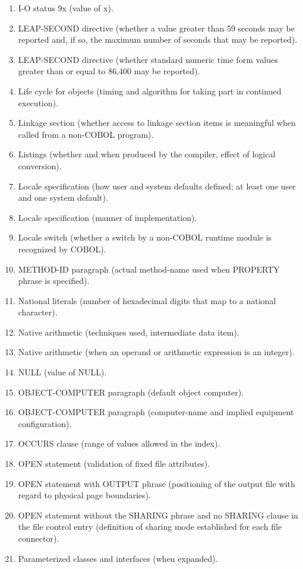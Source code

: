 \begin{enumerate}
\item I-O status 9x (value of x).
\item LEAP-SECOND directive (whether a value greater than 59 seconds may be reported and, if so, the maximum
  number of seconds that may be reported).
\item LEAP-SECOND directive (whether standard numeric time form values greater than or equal to 86,400 may be
  reported).
\item Life cycle for objects (timing and algorithm for taking part in continued execution).
\item Linkage section (whether access to linkage section items is meaningful when called from a non-COBOL
  program).
\item Listings (whether and when produced by the compiler, effect of logical conversion).
\item Locale specification (how user and system defaults defined; at least one user and one system default).
\item Locale specification (manner of implementation).
\item Locale switch (whether a switch by a non-COBOL runtime module is recognized by COBOL).
\item METHOD-ID paragraph (actual method-name used when PROPERTY phrase is specified).
\item National literals (number of hexadecimal digits that map to a national character).
\item Native arithmetic (techniques used, intermediate data item).
\item Native arithmetic (when an operand or arithmetic expression is an integer).
\item NULL (value of NULL).
\item OBJECT-COMPUTER paragraph (default object computer).
\item OBJECT-COMPUTER paragraph (computer-name and implied equipment configuration).
\item OCCURS clause (range of values allowed in the index).
\item OPEN statement (validation of fixed file attributes).
\item OPEN statement with OUTPUT phrase (positioning of the output file with regard to physical page boundaries).
\item OPEN statement without the SHARING phrase and no SHARING clause in the file control entry (definition of sharing mode established for each file connector).
\item Parameterized classes and interfaces (when expanded).

\end{enumerate}
